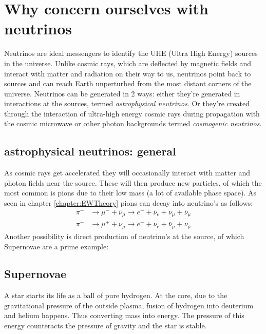 \documentclass[11pt,a4paper,faculty=we,language=en,doctype=report]{cls/ugent-doc}
\begin{document}
\section{Why concern ourselves with neutrinos}
Neutrinos are ideal messengers to identify the UHE (Ultra High Energy) sources
in the universe. Unlike cosmic rays, which are deflected by magnetic fields and
interact with matter and radiation on their way to us, neutrinos point back to
sources and can reach Earth unperturbed from the most distant corners of the
universe.  Neutrinos can be generated in 2 ways: either they're generated in
interactions at the sources, termed \textit{astrophysical neutrinos}. Or
they're created through the interaction of ultra-high energy cosmic rays during
propagation with the cosmic microwave or other photon backgrounds termed
\textit{cosmogenic neutrinos}. 
\subsection{astrophysical neutrinos: general}
As cosmic rays get accelerated they will occasionally interact with matter
and photon fields near the source. These will then produce new particles,
of which the most common is pions due to their low mass (a lot of available 
phase space). As seen in chapter \ref{chapter:EWTheory} pions can decay
into neutrino's as follows:
\begin{eqnarray}
	\pi^- &\rightarrow \mu^- + \bar{\nu}_\mu \rightarrow e^- + \bar{\nu}_e + \nu_\mu + \bar{\nu}_\mu\\
	\pi^+ &\rightarrow \mu^+ + \nu_\mu \rightarrow e^+ + \nu_e + \bar{\nu}_\mu + \nu_\mu
\end{eqnarray}
Another possibility is direct production of neutrino's at the source, of which Supernovae are
a prime example:
\subsection{Supernovae}
A star starts its life as a ball of pure hydrogen. At the core, due to the
gravitational pressure of the outside plasma, fusion of hydrogen into deuterium
and helium happens. Thus converting mass into energy. The pressure of this energy
counteracts the pressure of gravity and the star is stable.
\end{document}
